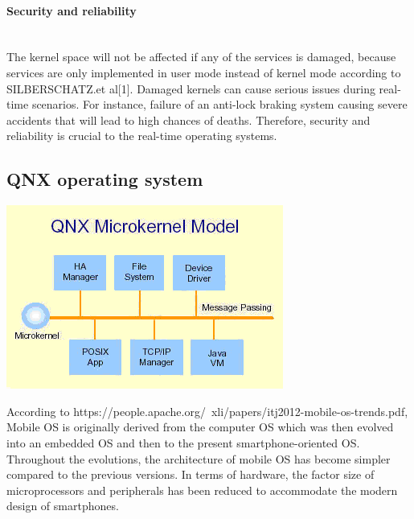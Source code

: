 \documentclass[conference]{IEEEtran}
\begin{document}
\paragraph{Security and reliability}\mbox{} \\
The kernel space will not be affected if any of the services is damaged, because services are only implemented in user mode instead of kernel mode according to SILBERSCHATZ.et al[1]. Damaged kernels can cause serious issues during real-time scenarios. For instance, failure of an anti-lock braking system causing severe accidents that will lead to high chances of deaths. Therefore, security and reliability is crucial to the real-time operating systems.

\subsection{QNX operating system}
\begin{center}
\includegraphics[scale=0.5]{./images/QNX_microkernel_mode.png}
\end{center}
According to https://people.apache.org/~xli/papers/itj2012-mobile-os-trends.pdf, Mobile OS is originally derived from the computer OS which was then evolved into an embedded OS and then to the present smartphone-oriented OS. Throughout the evolutions, the architecture of mobile OS has become simpler compared to the previous versions. In terms of hardware, the factor size of microprocessors and peripherals has been reduced to accommodate the modern design of smartphones.\cite{NOSvsEOS}

\end{document}
